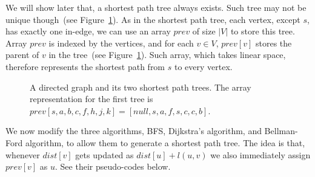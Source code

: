We will show later that, a shortest path tree always exists. %
Such tree may not be unique though~(see Figure~\ref{fig:tree}).
As in the shortest path tree, each vertex, except $s$, has exactly one in-edge, we can use an array $prev$ of size $|V|$
to store this tree. Array $prev$ is indexed by the vertices, and for each $v\in V$, $prev[v]$ stores the parent of $v$
in the tree~(see Figure~\ref{fig:tree}).
Such array, which takes linear space, therefore represents the shortest path from $s$ to every vertex.

\begin{figure}[h]
\centering{}
\caption{A directed graph and its two shortest path trees. The array representation
for the first tree is $prev[s,a,b,c,f,h,j,k] = [null, s, a, f, s, c, c, b]$.}
\label{fig:tree}
\end{figure}



We now modify the three algorithms, BFS, Dijkstra's algorithm, and Bellman-Ford algorithm, to allow them to generate a shortest path tree.
The idea is that, %
whenever $dist[v]$ gets updated as $dist[u] + l(u,v)$ we also immediately assign $prev[v]$ as $u$.
See their pseudo-codes below.

\begin{minipage}{0.8\textwidth}
	\xxx
	\xxx
	\aab {\textcolor{blue}{$prev[v] = null$, for any $v\in V$};}\xxx
	\xxx
	\xxx
	\xxx
	\xxx
	\xxx
	\xxx
	\xxx
	\xxx
	\xxx
	\aae {\textcolor{blue}{$prev[v] = u$;}}\xxx
	\xxx
	\xxx
	\xxx
	\xxx
	\xxx
\end{minipage}


